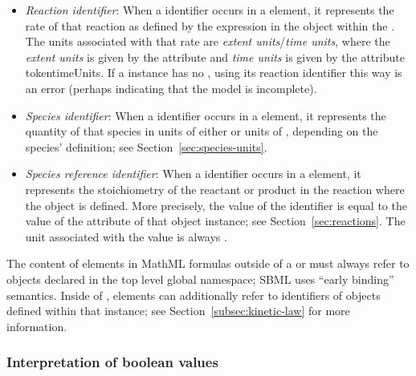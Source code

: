\begin{itemize}
\begin{itemize}
  \item \emph{Reaction identifier}: When a \Reaction identifier
    occurs in a  element, it represents the rate of that
    reaction as defined by the  expression in the
    \KineticLaw object within the \Reaction.  The units associated
    with that rate are \emph{extent units}/\emph{time units},
    where the \emph{extent units} is given by the \Model attribute
     and \emph{time units} is given by the
    \Model attribute token{timeUnits}.  If a \Reaction instance has
    no \KineticLaw , using its reaction identifier this way is an
    error (perhaps indicating that the model is incomplete).
    
  \item \emph{Species identifier}: When a \Species identifier
    occurs in a  element, it represents the quantity of
    that species in units of either  or units of , depending
      on the species' definition; see
    Section~\ref{sec:species-units}.

  \item \emph{Species reference identifier}: When a
    \SpeciesReference identifier occurs in a  element,
    it represents the stoichiometry of the reactant or product in
    the reaction where the \SpeciesReference object is defined.
    More precisely, the value of the \SpeciesReference
    identifier is equal to the value of the 
    attribute of that \SpeciesReference object instance; see
    Section~\ref{sec:reactions}.  The unit associated with the
    value is always .
    
  \end{itemize}

\end{itemize}

The content of  elements in MathML formulas outside of a
\KineticLaw or \FunctionDefinition must always refer to objects
declared in the top level global namespace; \ie SBML uses ``early
binding'' semantics.  Inside of \KineticLaw,  elements
can additionally refer to identifiers of \LocalParameter objects
defined within that \KineticLaw instance; see
Section~\ref{subsec:kinetic-law} for more information.


\subsubsection{Interpretation of boolean values}
\label{sec:handling-booleans}

